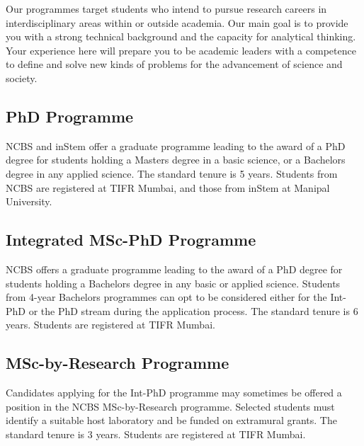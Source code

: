 \documentclass[a4paper]{extarticle}
\begin{document}
Our programmes target students who intend to pursue research careers in interdisciplinary
areas within or outside academia. Our main goal is to provide you with a strong technical
background and the capacity for analytical thinking. Your experience here will prepare you
to be academic leaders with a competence to define and solve new kinds of problems for the
advancement of science and society.

\subsection{PhD Programme}
NCBS and inStem offer a graduate programme leading to the award of a
PhD degree for students holding a Masters degree in a basic science, or a Bachelors degree
in any applied science. The standard tenure is 5 years. Students from NCBS are registered at
TIFR Mumbai, and those from inStem at Manipal University.

\subsection{Integrated MSc-PhD Programme}
NCBS offers a graduate programme leading to the
award of a PhD degree for students holding a Bachelors degree in any basic or applied
science. Students from 4-year Bachelors programmes can opt to be considered either for the
Int-PhD or the PhD stream during the application process. The standard tenure is 6 years.
Students are registered at TIFR Mumbai.

\subsection{MSc-by-Research Programme}
Candidates applying for the Int-PhD programme may
sometimes be offered a position in the NCBS MSc-by-Research programme. Selected
students must identify a suitable host laboratory and be funded on extramural grants. The
standard tenure is 3 years. Students are registered at TIFR Mumbai.
\end{document}
